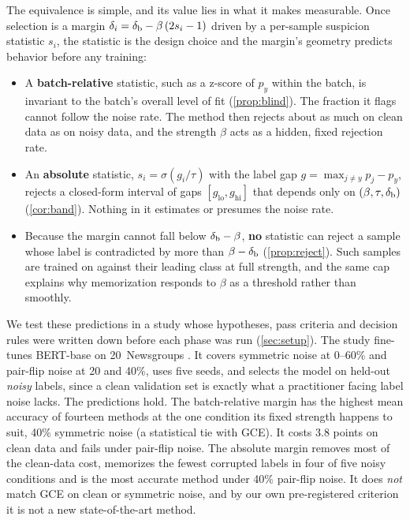 The equivalence is simple, and its value lies in what it makes measurable. Once selection is a
margin $\delta_i = \delta_{\mathrm{b}} - \beta\,(2 s_i - 1)$ driven by a per-sample suspicion statistic $s_i$,
the statistic is the design choice and the margin's geometry predicts behavior before any training:
\begin{itemize}
  \item A \textbf{batch-relative} statistic, such as a z-score of $p_y$ within the batch, is invariant
  to the batch's overall level of fit (\cref{prop:blind}). The fraction it flags cannot follow the
  noise rate. The method then rejects about as much on clean data as on noisy data, and the
  strength $\beta$ acts as a hidden, fixed rejection rate.
  \item An \textbf{absolute} statistic, $s_i = \sigma(g_i/\tau)$ with the label gap
  $g = \max_{j\ne y} p_j - p_y$, rejects a closed-form interval of gaps $[g_{\mathrm{lo}}, g_{\mathrm{hi}}]$
  that depends only on $(\beta,\tau,\delta_{\mathrm{b}})$ (\cref{cor:band}). Nothing in it estimates or
  presumes the noise rate.
  \item Because the margin cannot fall below $\delta_{\mathrm{b}} - \beta$, \textbf{no} statistic can reject a
  sample whose label is contradicted by more than $\beta - \delta_{\mathrm{b}}$ (\cref{prop:reject}). Such
  samples are trained on against their leading class at full strength, and the same cap explains
  why memorization responds to $\beta$ as a threshold rather than smoothly.
\end{itemize}

We test these predictions in a study whose hypotheses, pass criteria and decision rules were
written down before each phase was run (\cref{sec:setup}). The study fine-tunes BERT-base
\citep{devlin2019bert} on 20~Newsgroups \citep{lang1995newsweeder}. It covers symmetric noise at
0--60\% and pair-flip noise at 20 and 40\%, uses five seeds, and selects the model on held-out
\emph{noisy} labels, since a clean validation set is exactly what a practitioner facing label
noise lacks. The predictions hold. The batch-relative margin has the highest mean accuracy of
fourteen methods at the one condition its fixed strength happens to suit, 40\% symmetric noise (a
statistical tie with GCE). It costs 3.8 points on
clean data and fails under pair-flip noise. The absolute margin removes most of the clean-data
cost, memorizes the fewest corrupted labels in four of five noisy conditions and is the most
accurate method under 40\% pair-flip noise. It does \emph{not} match GCE on clean or symmetric
noise, and by our own pre-registered criterion it is not a new state-of-the-art method.

